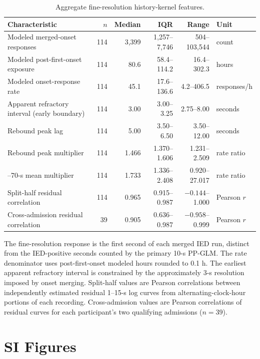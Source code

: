 \documentclass[11pt]{article}
\begin{document}
\clearpage
\begin{table}[H]
\centering
\caption{Aggregate fine-resolution history-kernel features.}
\label{tab:kernel-feature-summary}
\footnotesize
\begin{tabularx}{\textwidth}{@{}>{\raggedright\arraybackslash}X r r r r l@{}}
\toprule
Characteristic & $n$ & Median & IQR & Range & Unit \\
\midrule
Modeled merged-onset responses & 114 & 3,399 & 1,257--7,746 & 504--103,544 & count \\
Modeled post-first-onset exposure & 114 & 80.6 & 58.4--114.2 & 16.4--302.3 & hours \\
Modeled onset-response rate & 114 & 45.1 & 17.6--136.6 & 4.2--406.5 & responses/h \\
Apparent refractory interval (early boundary) & 114 & 3.00 & 3.00--3.25 & 2.75--8.00 & seconds \\
Rebound peak lag & 114 & 5.00 & 3.50--6.50 & 3.50--12.00 & seconds \\
Rebound peak multiplier & 114 & 1.466 & 1.370--1.606 & 1.231--2.509 & rate ratio \\
40--70-s mean multiplier & 114 & 1.733 & 1.336--2.408 & 0.920--27.017 & rate ratio \\
Split-half residual correlation & 114 & 0.965 & 0.915--0.987 & $-0.144$--1.000 & Pearson $r$ \\
Cross-admission residual correlation & 39 & 0.905 & 0.636--0.987 & $-0.958$--0.999 & Pearson $r$ \\
\bottomrule
\end{tabularx}
\vspace{0.4em}
\begin{minipage}{\textwidth}\footnotesize
The fine-resolution response is the first second of each merged IED run, distinct from the IED-positive seconds counted by the primary 10-s PP-GLM. The rate denominator uses post-first-onset modeled hours rounded to 0.1 h. The earliest apparent refractory interval is constrained by the approximately 3-s resolution imposed by onset merging. Split-half values are Pearson correlations between independently estimated residual 1--15-s log curves from alternating-clock-hour portions of each recording. Cross-admission values are Pearson correlations of residual curves for each participant's two qualifying admissions ($n=39$).
\end{minipage}
\end{table}

\clearpage
\section*{SI Figures}
\end{document}
